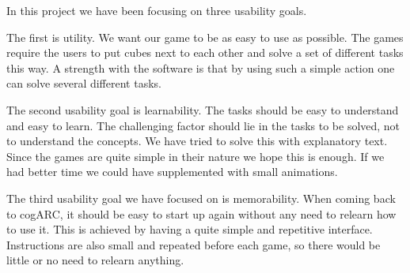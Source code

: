 In this project we have been focusing on three usability goals\cite{rogers2011interaction}.

The first is utility. We want our game to be as easy to use as possible. The
games require the users to put cubes next to each other and solve a set of
different tasks this way. A strength with the software is that by using such
a simple action one can solve several different tasks.

The second usability goal is learnability. The tasks should be easy to
understand and easy to learn. The challenging factor should lie in the tasks
to be solved, not to understand the concepts. We have tried to solve this
with explanatory text. Since the games are quite simple in their nature we
hope this is enough. If we had better time we could have supplemented with
small animations.

The third usability goal we have focused on is memorability. When coming back
to cogARC, it should be easy to start up again without any need to relearn how
to use it. This is achieved by having a quite simple and repetitive interface.
Instructions are also small and repeated before each game, so there would be
little or no need to relearn anything.